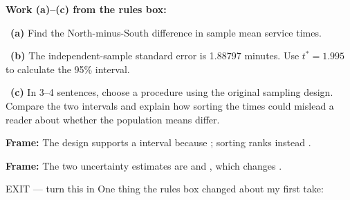 \documentclass[11pt]{article}
\begin{document}
\newpage
\textbf{Work (a)--(c) from the rules box:}\par\smallskip

~\textbf{(a)} Find the North-minus-South difference in sample mean service times.\par
\workspace{0.8in}

~\textbf{(b)} The independent-sample standard error is 1.88797 minutes. Use $t^*=1.995$ to calculate the 95\% interval.\par
\workspace{1.4in}

~\textbf{(c)} In 3--4 sentences, choose a procedure using the original sampling design. Compare the two intervals and explain how sorting the times could mislead a reader about whether the population means differ.\par
\workspace{2.0in}

\begin{sentenceframebox}\raggedright\textbf{Frame:} The design supports a \blank[1.6in] interval because \blank[2.2in]; sorting ranks instead \blank[2.0in].\end{sentenceframebox}

\begin{sentenceframebox}\raggedright\textbf{Frame:} The two uncertainty estimates are \blank[1.6in] and \blank[1.6in], which changes \blank[2.0in].\end{sentenceframebox}

\begin{summaryexitbox}{EXIT --- turn this in}
One thing the rules box changed about my first take: \hrulefill\par
\workspace{0.4in}
\end{summaryexitbox}
\end{document}
